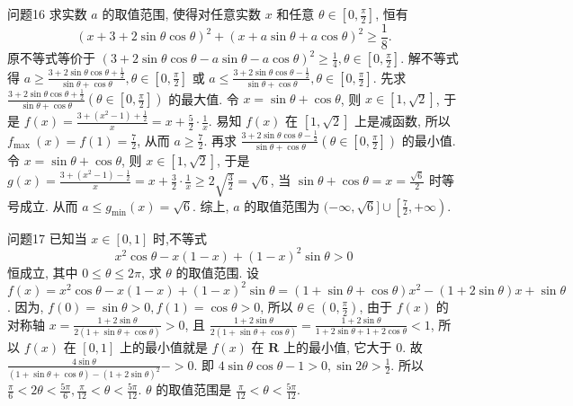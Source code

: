 问题16 求实数 $a$ 的取值范围, 使得对任意实数 $x$ 和任意 $\theta \in\left[0, \frac{\pi}{2}\right]$, 恒有
$$
(x+3+2 \sin \theta \cos \theta)^2+(x+a \sin \theta+a \cos \theta)^2 \geqslant \frac{1}{8} .
$$
原不等式等价于 $(3+2 \sin \theta \cos \theta-a \sin \theta-a \cos \theta)^2 \geqslant \frac{1}{4}, \theta \in \left[0, \frac{\pi}{2}\right]$. 
解不等式得 $a \geqslant \frac{3+2 \sin \theta \cos \theta+\frac{1}{2}}{\sin \theta+\cos \theta}, \theta \in\left[0, \frac{\pi}{2}\right]$ 或 $a \leqslant \frac{3+2 \sin \theta \cos \theta-\frac{1}{2}}{\sin \theta+\cos \theta}, \theta \in\left[0, \frac{\pi}{2}\right]$. 
先求 $\frac{3+2 \sin \theta \cos \theta+\frac{1}{2}}{\sin \theta+\cos \theta}\left(\theta \in\left[0, \frac{\pi}{2}\right]\right)$ 的最大值.
令 $x=\sin \theta+\cos \theta$, 则 $x \in[1, \sqrt{2}]$, 于是 $f(x)=\frac{3+\left(x^2-1\right)+\frac{1}{2}}{x}= x+\frac{5}{2} \cdot \frac{1}{x}$. 易知 $f(x)$ 在 $[1, \sqrt{2}]$ 上是减函数, 所以 $f_{\text {max }}(x)=f(1)=\frac{7}{2}$, 从而 $a \geqslant \frac{7}{2}$. 
再求 $\frac{3+2 \sin \theta \cos \theta-\frac{1}{2}}{\sin \theta+\cos \theta}\left(\theta \in\left[0, \frac{\pi}{2}\right]\right)$ 的最小值.
令 $x=\sin \theta+ \cos \theta$, 则 $x \in[1, \sqrt{2}]$, 于是 $g(x)=\frac{3+\left(x^2-1\right)-\frac{1}{2}}{x}=x+\frac{3}{2} \cdot \frac{1}{x} \geqslant 2 \sqrt{\frac{3}{2}}=\sqrt{6}$, 当 $\sin \theta+\cos \theta=x=\frac{\sqrt{6}}{2}$ 时等号成立.
从而 $a \leqslant g_{\min }(x)=\sqrt{6}$. 
综上, $a$ 的取值范围为 $(-\infty, \sqrt{6}] \cup\left[\frac{7}{2},+\infty\right)$.



问题17 已知当 $x \in[0,1]$ 时,不等式
$$
x^2 \cos \theta-x(1-x)+(1-x)^2 \sin \theta>0
$$
恒成立, 其中 $0 \leqslant \theta \leqslant 2 \pi$, 求 $\theta$ 的取值范围.
设 $f(x)=x^2 \cos \theta-x(1-x)+(1-x)^2 \sin \theta=(1+\sin \theta+\cos \theta) x^2- (1+2 \sin \theta) x+\sin \theta$. 因为, $f(0)=\sin \theta>0, f(1)=\cos \theta>0$, 所以 $\theta \in\left(0, \frac{\pi}{2}\right)$, 由于 $f(x)$ 的对称轴 $x=\frac{1+2 \sin \theta}{2(1+\sin \theta+\cos \theta)}>0$, 且 $\frac{1+2 \sin \theta}{2(1+\sin \theta+\cos \theta)}= \frac{1+2 \sin \theta}{1+2 \sin \theta+1+2 \cos \theta}<1$, 所以 $f(x)$ 在 $[0,1]$ 上的最小值就是 $f(x)$ 在 $\mathbf{R}$ 上的最小值, 它大于 0. 故 $\frac{4 \sin \theta}{(1+\sin \theta+\cos \theta)-(1+2 \sin \theta)^2}->0$. 即 $4 \sin \theta \cos \theta-1>0, \sin 2 \theta>\frac{1}{2}$. 所以 $\frac{\pi}{6}<2 \theta<\frac{5 \pi}{6}, \frac{\pi}{12}<\theta<\frac{5 \pi}{12}$. $\theta$ 的取值范围是 $\frac{\pi}{12}<\theta<\frac{5 \pi}{12}$.



